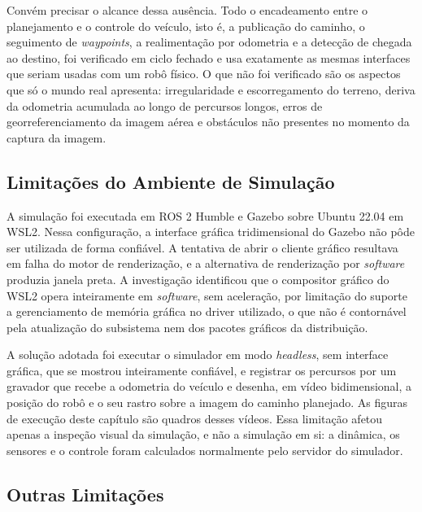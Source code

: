 \documentclass[
    12pt,
    openright,
    oneside,
    a4paper,
    english,
    brazil
]{abntex2}
\begin{document}
Convém precisar o alcance dessa ausência. Todo o encadeamento entre o planejamento e o controle do veículo, isto é, a publicação do caminho, o seguimento de \textit{waypoints}, a realimentação por odometria e a detecção de chegada ao destino, foi verificado em ciclo fechado e usa exatamente as mesmas interfaces que seriam usadas com um robô físico. O que não foi verificado são os aspectos que só o mundo real apresenta: irregularidade e escorregamento do terreno, deriva da odometria acumulada ao longo de percursos longos, erros de georreferenciamento da imagem aérea e obstáculos não presentes no momento da captura da imagem.

\subsection{Limitações do Ambiente de Simulação}

A simulação foi executada em ROS 2 Humble e Gazebo sobre Ubuntu 22.04 em WSL2. Nessa configuração, a interface gráfica tridimensional do Gazebo não pôde ser utilizada de forma confiável. A tentativa de abrir o cliente gráfico resultava em falha do motor de renderização, e a alternativa de renderização por \textit{software} produzia janela preta. A investigação identificou que o compositor gráfico do WSL2 opera inteiramente em \textit{software}, sem aceleração, por limitação do suporte a gerenciamento de memória gráfica no driver utilizado, o que não é contornável pela atualização do subsistema nem dos pacotes gráficos da distribuição.

A solução adotada foi executar o simulador em modo \textit{headless}, sem interface gráfica, que se mostrou inteiramente confiável, e registrar os percursos por um gravador que recebe a odometria do veículo e desenha, em vídeo bidimensional, a posição do robô e o seu rastro sobre a imagem do caminho planejado. As figuras de execução deste capítulo são quadros desses vídeos. Essa limitação afetou apenas a inspeção visual da simulação, e não a simulação em si: a dinâmica, os sensores e o controle foram calculados normalmente pelo servidor do simulador.

\subsection{Outras Limitações}
\end{document}
